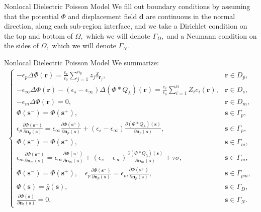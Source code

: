 \documentclass{beamer}
\newcommand{\dd}{{\mathbf d}}
\newcommand{\rr}{{\mathbf r}}
\newcommand{\s}{{\mathbf s}}
\newcommand{\nn}{{\mathbf n}}
\begin{document}
\begin{frame}{Nonlocal Dielectric Poisson Model}
    We fill out boundary conditions by assuming that the potential $\Phi$ and displacement field $\dd$ are continuous in the normal direction, along each sub-region interface, and we take a Dirichlet condition on the top and bottom of $\Omega,$ which we will denote $\Gamma_D,$ and a Neumann condition on the sides of $\Omega,$ which we will denote $\Gamma_N.$
\end{frame}
\begin{frame}{Nonlocal Dielectric Poisson Model}
    We summarize:
    \begin{align}
\label{phi-u1}
  \left\{\begin{array}{cl}
    -\epsilon_p\Delta\Phi(\rr) = \frac{e_{c}}{\epsilon_0}\sum\limits_{j=1}^{n_{p}}z_{j} \delta_{\rr_{j}}, & \rr \in D_p,\\
-\epsilon_{\infty}\Delta\Phi(\rr) - (\epsilon_s-\epsilon_{\infty}) \Delta(\Phi\ast  Q_{\lambda})(\rr) 
= \frac{e_{c}}{\epsilon_0}\sum\limits_{i=1}^{n}Z_{i}c_{i}(\rr), & \rr \in D_s,\\
-\epsilon_m \Delta \Phi(\rr) = 0, & \rr \in D_m, \\
\Phi(\s^{-}) = \Phi(\s^{+}), & \s\in\Gamma_p,\\
\epsilon_p\frac{\partial\Phi(\s^{-})}{\partial \nn_p(\s)} = \epsilon_\infty\frac{\partial\Phi(\s^{+})}{\partial \nn_p(\s)}+(\epsilon_s-\epsilon_\infty)\frac{\partial (\Phi\ast Q_{\lambda})(\s)}{\partial \nn_p(\s)}, & \s\in\Gamma_p,\\[0.2em]
\Phi(\s^{-}) = \Phi(\s^{+}), & \s\in\Gamma_m,\\
\epsilon_m\frac{\partial\Phi(\s^{-})}{\partial \nn_m(\s)} = \epsilon_\infty\frac{\partial\Phi(\s^{+})}{\partial \nn_m(\s)}+(\epsilon_s-\epsilon_\infty)\frac{\partial (\Phi\ast Q_{\lambda})(\s)}{\partial \nn_m(\s)} + \tau \sigma, & \s\in\Gamma_m,\\[0.2em]
\Phi(\s^{-}) = \Phi(\s^{+}), \quad  \epsilon_p\frac{\partial\Phi(\s^{-})}{\partial \nn_p(\s)} = \epsilon_m\frac{\partial\Phi(\s^{+})}{\partial \nn_p(\s)}, \quad &\s \in \Gamma_{pm}, \\
   \Phi(\s) = \bar{g}(\s), & \s \in \Gamma_D, \\
   \frac{\partial \Phi(\s)}{\partial \nn_b(\s)} = 0, & \s \in \Gamma_N.
  \end{array}
\right
.
\end{align}
\end{frame}
\end{document}
